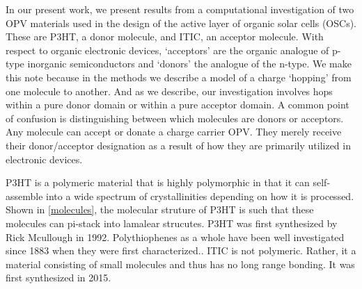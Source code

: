 In our present work, we present results from a computational investigation of two OPV materials
used in the design of the active layer of organic solar cells (OSCs). These are P3HT, a
donor molecule, and ITIC, an acceptor molecule. With respect to organic electronic devices, `acceptors' are the
organic analogue of p-type inorganic semiconductors and `donors' the analogue
of the n-type. We make this note because in the methods we describe a model of
a charge `hopping' from one molecule to another. And as we describe, our
investigation involves hops within a pure donor domain or within a pure
acceptor domain. A common point of confusion is distinguishing between which
molecules are donors or acceptors.
Any molecule can accept or donate a charge carrier OPV.
They merely receive their donor/acceptor designation as a result of how they
are primarily utilized in electronic devices. 

P3HT is a polymeric material that is highly polymorphic in that it can self-assemble into a wide spectrum of
crystallinities depending on how it is processed. Shown in \autoref{molecules}, the molecular struture of P3HT
is such that these molecules can pi-stack into lamalear strucutes. 
P3HT was first synthesized by Rick Mcullough in 1992. Polythiophenes as a whole have been well investigated 
since 1883 when they were first characterized.\cite{Poelking2014}.
ITIC is not polymeric. Rather, it a material consisting of small molecules and thus has no long range bonding.
It was first synthesized in 2015. \cite{Bai201U}

